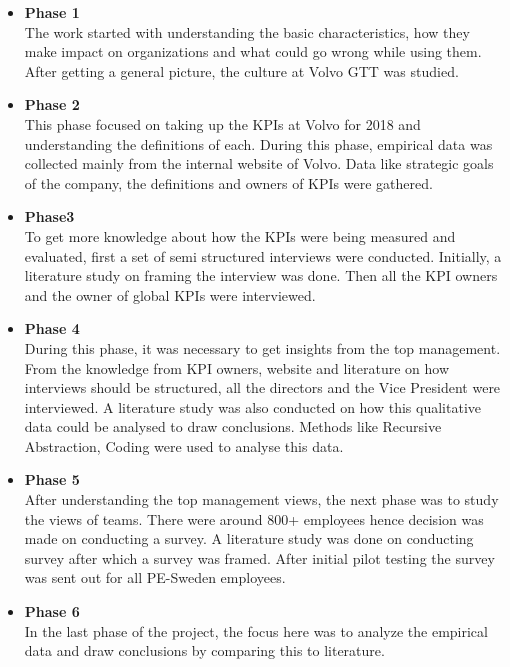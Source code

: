 \begin{itemize}
    \item \textbf{Phase 1}\\
        The work started with understanding the basic characteristics, how they make impact on organizations and what could go wrong while using them. After getting a general picture, the culture at Volvo GTT was studied.\\

    \item \textbf{Phase 2}\\
        This phase focused on taking up the KPIs at Volvo for 2018 and understanding the definitions of each. During this phase, empirical data was collected mainly from the internal website of Volvo. Data like strategic goals of the company, the definitions and owners of KPIs were gathered.\\

    \item \textbf{Phase3}\\
        To get more knowledge about how the KPIs were being measured and evaluated, first a set of semi structured interviews were conducted. Initially, a literature study on framing the interview was done. Then all the KPI owners and the owner of global KPIs were interviewed.\\

    \item \textbf{Phase 4}\\
        During this phase, it was necessary to get insights from the top management. From the knowledge from KPI owners, website and literature on how interviews should be structured, all the directors and the Vice President were interviewed.
A literature study was also conducted on how this qualitative data could be analysed to draw conclusions. Methods like Recursive Abstraction, Coding were used to analyse this data.
\\

    \item \textbf{Phase 5}\\
        After understanding the top management views, the next phase was to study the views of teams. There were around 800+ employees hence decision was made on conducting a survey. A literature study was done on conducting survey after which a survey was framed. After initial pilot testing the survey was sent out for all PE-Sweden employees.\\  

    \item \textbf{Phase 6}\\
        In the last phase of the project, the focus here was to analyze the empirical data and draw conclusions by comparing this to literature.\\ 

\end{itemize}
